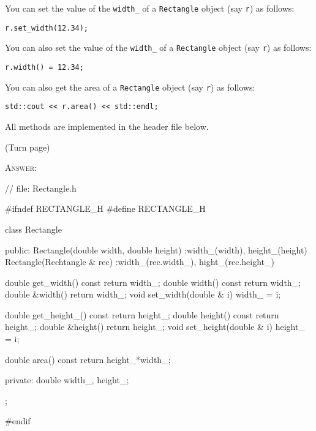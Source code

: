 \begin{enumerate}[nosep]
\li You can set the value of the \verb!width_! of a \verb!Rectangle! object
    (say \verb!r!) as follows:
    \begin{Verbatim}[frame=single,fontsize=\small]
r.set_width(12.34);
    \end{Verbatim}

\li You can also set the value of the \verb!width_! of a \verb!Rectangle!
    object (say \verb!r!) as follows:
    \begin{Verbatim}[frame=single,fontsize=\small]
r.width() = 12.34;
    \end{Verbatim}
    
\li You can also get the area of a \verb!Rectangle! object (say \verb!r!) as
    follows:
    \begin{Verbatim}[frame=single,fontsize=\small]
std::cout << r.area() << std::endl;
    \end{Verbatim}
    
\end{enumerate}
All methods are implemented in the header file below.

(Turn page)

\newpage
\textsc{Answer:}
\begin{answercode}
// file: Rectangle.h

#ifndef RECTANGLE_H
#define RECTANGLE_H

class Rectangle
{
public:
    Rectangle(double width, double height)
        :width_(width), height_(height)
    {}
    Rectangle(Rechtangle & rec)
        :width_(rec.width_), hight_(rec.height_)
    {}

    double  get_width()   const { return width_;  }
    double  width()       const { return width_;  }
    double &width()             { return width_;  }
    void    set_width(double & i) { width_ = i; }

    double  get_height_() const { return height_; }
    double  height()      const { return height_; }
    double &height()            { return height_; }
    void    set_height(double & i) { height_ = i; }

    double  area()        const { return height_*width_; }
    
private:
    double width_, height_;
};

#endif
\end{answercode}


